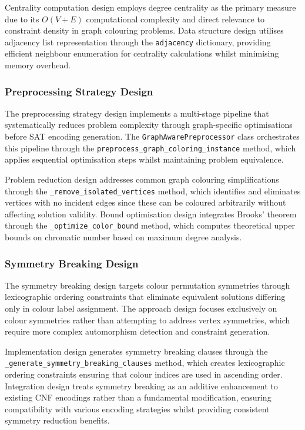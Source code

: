 Centrality computation design employs degree centrality as the primary measure due to its $O(V+E)$ computational complexity and direct relevance to constraint density in graph colouring problems. Data structure design utilises adjacency list representation through the \texttt{adjacency} dictionary, providing efficient neighbour enumeration for centrality calculations whilst minimising memory overhead.

\subsubsection{Preprocessing Strategy Design}

The preprocessing strategy design implements a multi-stage pipeline that systematically reduces problem complexity through graph-specific optimisations before SAT encoding generation. The \texttt{GraphAwarePreprocessor} class orchestrates this pipeline through the \texttt{preprocess\_graph\_coloring\_instance} method, which applies sequential optimisation steps whilst maintaining problem equivalence.

Problem reduction design addresses common graph colouring simplifications through the \texttt{\_remove\_isolated\_vertices} method, which identifies and eliminates vertices with no incident edges since these can be coloured arbitrarily without affecting solution validity. Bound optimisation design integrates Brooks' theorem through the \texttt{\_optimize\_\-color\_\-bound} method, which computes theoretical upper bounds on chromatic number based on maximum degree analysis.

\subsubsection{Symmetry Breaking Design}

The symmetry breaking design targets colour permutation symmetries through lexicographic ordering constraints that eliminate equivalent solutions differing only in colour label assignment. The approach design focuses exclusively on colour symmetries rather than attempting to address vertex symmetries, which require more complex automorphism detection and constraint generation.

Implementation design generates symmetry breaking clauses through the \texttt{\_generate\_\-symmetry\_\-breaking\_\-clauses} method, which creates lexicographic ordering constraints ensuring that colour indices are used in ascending order. Integration design treats symmetry breaking as an additive enhancement to existing CNF encodings rather than a fundamental modification, ensuring compatibility with various encoding strategies whilst providing consistent symmetry reduction benefits.